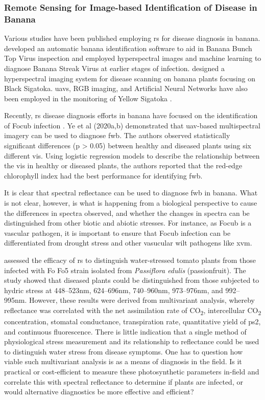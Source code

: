 \subsubsection{Remote Sensing for Image-based Identification of Disease in Banana}

Various studies have been published employing \ac{rs} for disease diagnosis in banana. \textcite{Johansen2014} developed an automatic banana identification software to aid in Banana Bunch Top Virus inspection and \textcite{Liao2018} employed hyperspectral images and machine learning to diagnose Banana Streak Virus at earlier stages of infection. \textcite{Ochoa2016} designed a hyperspectral imaging system for disease scanning on banana plants focusing on Black Sigatoka. \acp{uav}, RGB imaging, and Artificial Neural Networks have also been employed in the monitoring of Yellow Sigatoka \parencite{Calou2020}.  

Recently, \ac{rs} disease diagnosis efforts in banana have focused on the identification of \ac{Focub} infection \parencite{Ye2020a, Ye2020b, Selvaraj2019}.  Ye et al (2020a,b) demonstrated that \ac{uav}-based multispectral imagery can be used to diagnose \ac{fwb}. The authors observed statistically significant differences (p > 0.05) between healthy and diseased plants using six different \acp{vi}. Using logistic regression models to describe the relationship between the \acp{vi} in healthy or diseased plants, the authors reported that the red-edge chlorophyll index had the best performance for identifying \ac{fwb}.  

It is clear that spectral reflectance can be used to diagnose \ac{fwb} in banana. What is not clear, however, is what is happening from a biological perspective to cause the differences in spectra observed, and whether the changes in spectra can be distinguished from other biotic and abiotic stresses. For instance, as \ac{Focub} is a vascular pathogen, it is important to ensure that \ac{Focub} infection can be differentiated from drought stress and other vasucular wilt pathogens like \acf{xvm}. 

\textcite{Marin2020} assessed the efficacy of \ac{rs} to distinguish water-stressed tomato plants from those infected with \ac{Fo} Fo5 strain isolated from \textit{Passiflora edulis} (passionfruit). The study showed that diseased plants could be distinguished from those subjected to hydric stress at 448–523nm, 624–696nm, 740–960nm, 973–976nm, and 992–995nm. However, these results were derived from multivariant analysis, whereby reflectance was correlated with the net assimilation rate of CO\textsubscript{2}, intercellular CO\textsubscript{2} concentration, stomatal conductance, transpiration rate, quantitative yield of \ac{ps2}, and continuous fluorescence. There is little indication that a single method of physiological stress measurement and its relationship to reflectance could be used to distinguish water stress from disease symptoms. One has to question how viable such multivariant analysis is as a means of diagnosis in the field. Is it practical or cost-efficient to measure these photosynthetic parameters in-field and correlate this with spectral reflectance to determine if plants are infected, or would alternative diagnostics be more effective and efficient?   

